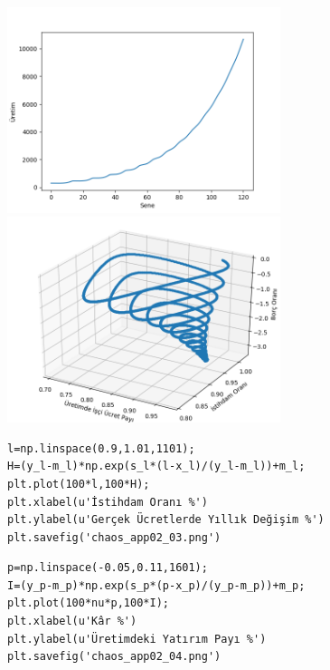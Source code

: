 \documentclass[12pt,fleqn]{article}\usepackage{../../common}
\begin{document}
\includegraphics[height=6cm]{chaos_app02_05.png}
\includegraphics[height=6cm]{chaos_app02_06.png}

\begin{verbatim}
l=np.linspace(0.9,1.01,1101);
H=(y_l-m_l)*np.exp(s_l*(l-x_l)/(y_l-m_l))+m_l;
plt.plot(100*l,100*H);
plt.xlabel(u'İstihdam Oranı %')
plt.ylabel(u'Gerçek Ücretlerde Yıllık Değişim %')
plt.savefig('chaos_app02_03.png')
\end{verbatim}

\begin{verbatim}
p=np.linspace(-0.05,0.11,1601);
I=(y_p-m_p)*np.exp(s_p*(p-x_p)/(y_p-m_p))+m_p; 
plt.plot(100*nu*p,100*I);
plt.xlabel(u'Kâr %')
plt.ylabel(u'Üretimdeki Yatırım Payı %')
plt.savefig('chaos_app02_04.png')
\end{verbatim}
\end{document}
